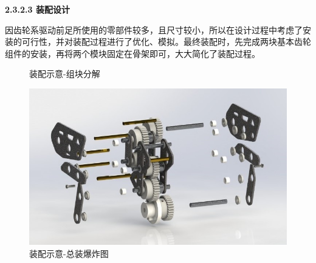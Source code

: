 \documentclass[12pt]{article}
\begin{document}
\begin{CJK}{UTF8}{gbsn}
\textbf{2.3.2.3	装配设计}\par
因齿轮系驱动前足所使用的零部件较多，且尺寸较小，所以在设计过程中考虑了安装的可行性，并对装配过程进行了优化、模拟。最终装配时，先完成两块基本齿轮组件的安装，再将两个模块固定在骨架即可，大大简化了装配过程。
\begin{figure}[H]
{}
\quad
{}
\caption{装配示意-组块分解}
\end{figure}

 \begin{figure}[H]
\centering
\includegraphics[width=.9\textwidth]{chap2//figj.jpg}
\caption{装配示意-总装爆炸图}
\end{figure}


\end{CJK}
\end{document}
